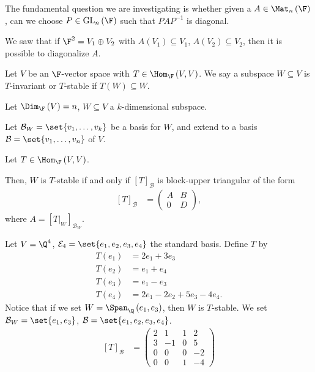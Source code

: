 \documentclass[10pt]{mypackage}
\begin{document}
\begin{recall}
  The fundamental question we are investigating is whether given a $A\in \Mat_{n}\left(\F\right)$, can we choose $P\in \text{GL}_{n}\left(\F\right)$ such that $PAP^{-1}$ is diagonal.\newline

  We saw that if $\F^2 = V_1\oplus V_2$ with $A\left(V_1\right) \subseteq V_1$, $A\left(V_2\right)\subseteq V_2$, then it is possible to diagonalize $A$.
\end{recall}
\begin{definition}
  Let $V$ be an $\F$-vector space with $T\in \Hom_{\F}\left(V,V\right)$. We say a subspace $W\subseteq V$ is $T$-invariant or $T$-stable if $T\left(W\right)\subseteq W$.
\end{definition}
\begin{theorem}
  Let $\Dim_{\F}\left(V\right) = n$, $W\subseteq V$ a $k$-dimensional subspace.\newline

Let $\mathcal{B}_{W} = \set{v_1,\dots,v_k}$ be a basis for $W$, and extend to a basis $\mathcal{B} = \set{v_1,\dots,v_n}$ of $V$.\newline

Let $T\in \Hom_{\F}\left(V,V\right)$.\newline

Then, $W$ is $T$-stable if and only if $\left[T\right]_{\mathcal{B}}$ is block-upper triangular of the form
\begin{align*}
  \left[T\right]_{\mathcal{B}} &= \begin{pmatrix}A & B \\ 0 & D\end{pmatrix},
\end{align*}
where $A = \left[T\vert_{W}\right]_{\mathcal{B}_W}$.
\end{theorem}
\begin{example}
  Let $V = \Q^4$, $\mathcal{E}_4 = \set{e_1,e_2,e_3,e_4}$ the standard basis. Define $T$ by
  \begin{align*}
    T\left(e_1\right) &= 2e_1 + 3e_3\\
    T\left(e_2\right) &= e_1 + e_4\\
    T\left(e_3\right) &= e_1 - e_3\\
    T\left(e_4\right) &= 2e_1 - 2e_2 + 5e_3 - 4e_4.
  \end{align*}
  Notice that if we set $W = \Span_{\Q}\left(e_1,e_3\right)$, then $W$ is $T$-stable. We set $\mathcal{B}_W = \set{e_1,e_3}$, $\mathcal{B} = \set{e_1,e_2,e_3,e_4}$.
  \begin{align*}
    \left[T\right]_{\mathcal{B}} &= \begin{pmatrix}2 & 1 & 1 & 2 \\ 3 & -1 & 0 & 5 \\ 0 & 0 & 0 & -2 \\ 0 & 0 & 1 & -4\end{pmatrix}
  \end{align*}
\end{example}
\end{document}
